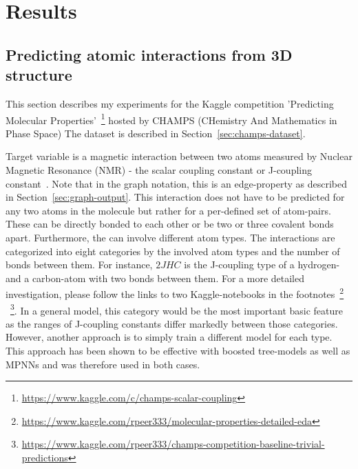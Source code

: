 \chapter{Results}
\label{chapter:Results}

\section{Predicting atomic interactions from 3D structure}
\label{sec:champs}

This section describes my experiments for the Kaggle competition 'Predicting Molecular Properties'~\footnote{\url{https://www.kaggle.com/c/champs-scalar-coupling}} hosted by CHAMPS (CHemistry And Mathematics in Phase Space)
The dataset is described in Section~\ref{sec:champs-dataset}.

Target variable is a magnetic interaction between two atoms measured by Nuclear Magnetic Resonance (NMR) - the scalar coupling constant or J-coupling constant~\cite{NMR}.
Note that in the graph notation, this is an edge-property as described in Section~\ref{sec:graph-output}. This interaction does not have to be predicted for any two atoms in the molecule but rather for a per-defined set of atom-pairs. These can be directly bonded to each other or be two or three covalent bonds apart. Furthermore, the can involve different atom types. The interactions are categorized into eight categories by the involved atom types and the number of bonds between them. For instance, $2JHC$ is the J-coupling type of a hydrogen- and a carbon-atom with two bonds between them. For a more detailed investigation, please follow the links to two Kaggle-notebooks in the footnotes~\footnote{\url{https://www.kaggle.com/rpeer333/molecular-properties-detailed-eda}}
	~\footnote{\url{https://www.kaggle.com/rpeer333/champs-competition-baseline-trivial-predictions}}.
In a general model, this category would be the most important basic feature as the ranges of J-coupling constants differ markedly between those categories. However, another approach is to simply train a different model for each type. This approach has been shown to be effective with boosted tree-models as well as MPNNs and was therefore used in both cases.

